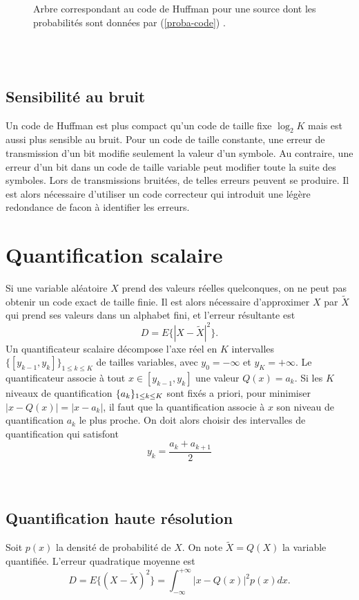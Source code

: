 \begin{figure}[bhtp]
\centerline{
        \epsfxsize=6cm
	\leavevmode{}}
\caption {Arbre correspondant au code de Huffman pour une
source dont les probabilit\'es sont donn\'ees par
(\protect \ref{proba-code}) \protect \cite{vetterli}.}
\label{arbre-binaire}
\end{figure}
\\
\\
\noindent
\subsection{Sensibilit\'e au bruit}
Un code de Huffman est plus compact qu'un code de taille fixe
$\log_2 K$ mais est aussi plus sensible au bruit.
Pour un code de taille constante, une erreur
de transmission d'un bit modifie
seulement la valeur d'un symbole.
Au contraire, une erreur d'un bit
dans un code de taille variable peut modifier toute la suite
des symboles.
Lors de transmissions bruit\'ees, de telles erreurs peuvent se
produire. Il est alors n\'ecessaire d'utiliser un code correcteur
qui introduit une l\'eg\`ere redondance de facon \`a identifier les
erreurs.

\section{Quantification scalaire}
\label{scalar-quant-sec}

Si une variable al\'eatoire $X$
prend des valeurs r\'eelles quelconques, on ne peut pas
obtenir un code exact de taille finie.
Il est alors n\'ecessaire d'approximer $X$ par
$\tilde X$ qui prend ses valeurs dans un alphabet fini, et
l'erreur r\'esultante est
\[
D = E \{|X - \tilde X|^2\} .
\]
Un quantificateur scalaire d\'ecompose l'axe r\'eel en
$K$ intervalles $\{[y_{k-1} , y_k ]\}_{1 \leq k \leq K}$
de tailles variables, avec $y_0 = -\infty$ et $y_K = +\infty$.
Le quantificateur associe \`a tout
$x \in [y_{k-1} , y_k]$ une valeur
$Q(x) =a_k$.
Si les $K$ niveaux de quantification $\{a_k\}_{{ 1 \leq k \leq K}}$
sont fix\'es a priori,
pour minimiser $|x - Q(x)| = |x - a_k|$,
il faut que la quantification
associe \`a $x$ son niveau de quantification $a_k$ le plus
proche. On doit alors choisir des intervalles de quantification
qui satisfont
\begin{equation}
\label{opt-interv}
y_k = \frac {a_k + a_{k+1}} 2
\end{equation}
\\
\\
\subsection{Quantification haute r\'esolution}
Soit $p(x)$ la densit\'e de probabilit\'e de $X$.
On note $\tilde X = Q (X)$ la variable quantifi\'ee.
L'erreur quadratique moyenne est
\begin{equation}
\label{quantize-error}
D = E\{(X- \tilde X)^2\} =
\int_{-\infty}^{+\infty} |x - Q(x)|^2 p(x) dx .
\end{equation}

